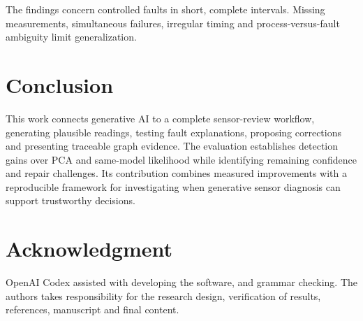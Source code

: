 \documentclass[conference]{IEEEtran}
\newcommand{\1}{\mathbf{1}}
\begin{document}
The findings concern controlled faults in short, complete intervals. Missing measurements, simultaneous failures, irregular timing and process-versus-fault ambiguity limit generalization.






\section{Conclusion}
This work connects generative AI to a complete sensor-review workflow, generating plausible readings, testing fault explanations, proposing corrections and presenting traceable graph evidence. The evaluation establishes detection gains over PCA and same-model likelihood while identifying remaining confidence and repair challenges. Its contribution combines measured improvements with a reproducible framework for investigating when generative sensor diagnosis can support trustworthy decisions.

\section*{Acknowledgment}
OpenAI Codex assisted with developing the software, and grammar checking. The authors takes responsibility for the research design, verification of results, references, manuscript and final content.


\end{document}
